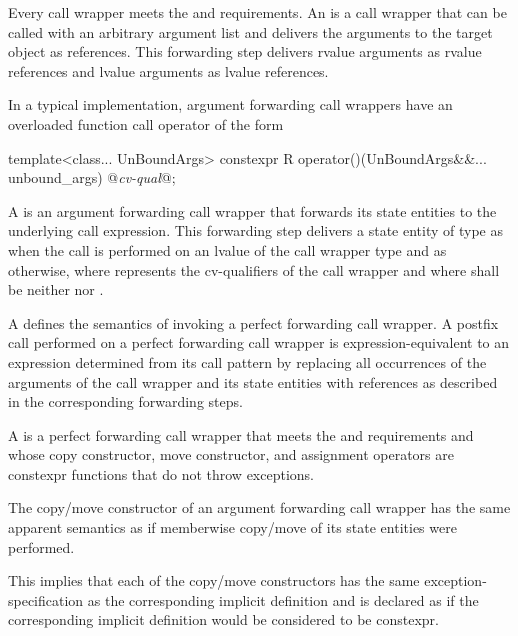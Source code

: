 \pnum
{}%
%
%
Every call wrapper meets the 
and  requirements.
An  is a
call wrapper that can be called with an arbitrary argument list
and delivers the arguments to the target object as references.
This forwarding step delivers rvalue arguments as rvalue references
and lvalue arguments as lvalue references.
\begin{note}
In a typical implementation, argument forwarding call wrappers have
an overloaded function call operator of the form
\begin{codeblock}
template<class... UnBoundArgs>
  constexpr R operator()(UnBoundArgs&&... unbound_args) @\textit{cv-qual}@;
\end{codeblock}
\end{note}

\pnum
\label{term.perfect.forwarding.call.wrapper}%
A  is
an argument forwarding call wrapper
that forwards its state entities to the underlying call expression.
This forwarding step delivers a state entity of type 
as \cv{} 
when the call is performed on an lvalue of the call wrapper type and
as \cv{}  otherwise,
where \cv{} represents the cv-qualifiers of the call wrapper and
where \cv{} shall be neither  nor .

\pnum
A  defines the semantics of invoking
a perfect forwarding call wrapper.
A postfix call performed on a perfect forwarding call wrapper is
expression-equivalent to
an expression  determined from its call pattern 
by replacing all occurrences
of the arguments of the call wrapper and its state entities
with references as described in the corresponding forwarding steps.

\pnum
\label{term.simple.call.wrapper}%
A  is a perfect forwarding call wrapper that meets
the  and  requirements
and whose copy constructor, move constructor, and assignment operators
are constexpr functions that do not throw exceptions.

\pnum
The copy/move constructor of an argument forwarding call wrapper has
the same apparent semantics
as if memberwise copy/move of its state entities
were performed.
\begin{note}
This implies that each of the copy/move constructors has
the same exception-specification as
the corresponding implicit definition and is declared as 
if the corresponding implicit definition would be considered to be constexpr.
\end{note}

